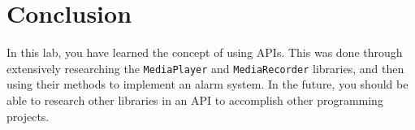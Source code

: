 \section{Conclusion}

In this lab, you have learned the concept of using APIs. This was done through extensively researching the \verb=MediaPlayer= and \verb=MediaRecorder= libraries, and then using their methods to implement an alarm system. In the future, you should be able to research other libraries in an API to accomplish other programming projects.